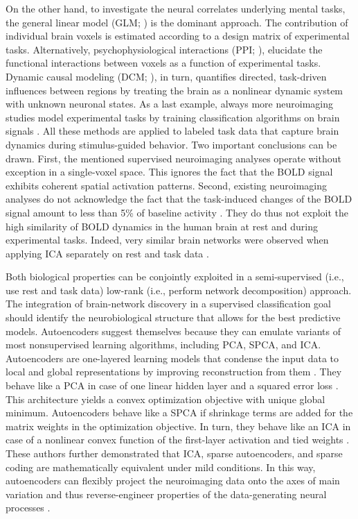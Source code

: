 \documentclass{article} %
\begin{document}
On the other hand, to investigate
the neural correlates underlying mental tasks,
the general linear model (GLM; \cite{friston94}) is the dominant approach.
The contribution of
individual brain voxels is estimated
according to a design matrix of experimental tasks.
Alternatively, psychophysiological interactions (PPI; \cite{friston97}),
elucidate the functional interactions between voxels as a function
of experimental tasks.
Dynamic causal modeling (DCM; \cite{stephan04}), in turn, quantifies directed,
task-driven influences between regions
by treating the brain as a nonlinear dynamic system with unknown
neuronal states. As a last example, always more neuroimaging studies model
experimental tasks by training classification algorithms on brain signals
\cite{poldrack09decoding}.
All these methods are applied to labeled task data that capture brain dynamics
during stimulus-guided behavior.
Two important conclusions can be drawn.
First, the mentioned supervised neuroimaging analyses operate
without exception in a single-voxel space. This ignores the fact that the BOLD
signal exhibits coherent spatial activation patterns.
Second, existing neuroimaging analyses do not acknowledge the fact that the
task-induced changes of the BOLD signal amount to less than 5\%
of baseline activity \cite{fox07}. They do thus not exploit the high similarity
of BOLD dynamics in the human brain at rest and during experimental tasks.
Indeed, very similar brain networks were observed when applying ICA
separately on rest and task data \cite{smith2009}.

Both biological properties can be conjointly exploited in a 
semi-supervised (i.e., use rest and task data)
low-rank (i.e., perform network decomposition)
approach.
%
The integration of brain-network discovery in a 
supervised classification goal should identify the
neurobiological structure that allows for the best predictive models.
%
Autoencoders suggest themselves because they can emulate
variants of most nonsupervised learning algorithms,
including PCA, SPCA, and ICA.
Autoencoders
are one-layered learning models that condense the input data to
local and global representations
by improving reconstruction from them \cite{hinton06}.
%
They behave like a PCA
in case of one linear hidden layer and a squared error loss
\cite{baldi1989neural}.
This architecture yields a convex optimization objective
with unique global minimum.
Autoencoders behave like a SPCA if shrinkage terms are added for the
matrix weights in the optimization objective.
In turn, they behave like an ICA in case of a nonlinear convex
function of the first-layer activation and tied weights \cite{le2011ica}.
These authors further demonstrated that ICA, sparse autoencoders, and 
sparse coding are mathematically equivalent
under mild conditions.
In this way, autoencoders can flexibly project the neuroimaging data
onto the axes of main variation and thus
reverse-engineer properties of the data-generating
neural processes \cite{olshausen96}.
\end{document}
